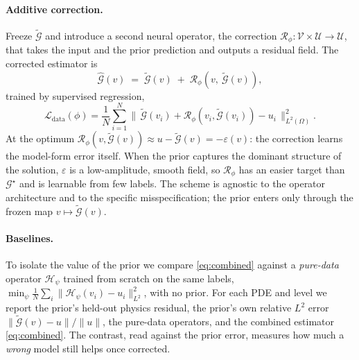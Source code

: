 \documentclass[11pt]{article}
\newcommand{\dom}{\Omega}
\newcommand{\Gtrue}{\mathcal{G}^{\star}}
\newcommand{\Gprior}{\widetilde{\mathcal{G}}}
\newcommand{\Ghat}{\widehat{\mathcal{G}}}
\newcommand{\Rcorr}{\mathcal{R}}
\newcommand{\norm}[1]{\lVert #1 \rVert}
\begin{document}
\paragraph{Additive correction.}
Freeze $\Gprior$ and introduce a second neural operator, the correction
$\Rcorr_\phi:\mathcal{V}\times\mathcal{U}\to\mathcal{U}$, that takes the input and the prior
prediction and outputs a residual field. The corrected estimator is
\begin{equation}
\label{eq:combined}
\Ghat(v) \;=\; \Gprior(v) \;+\; \Rcorr_\phi\!\left(v,\ \Gprior(v)\right),
\end{equation}
trained by supervised regression,
\begin{equation}
\label{eq:dataloss}
\mathcal{L}_{\mathrm{data}}(\phi)
= \frac{1}{N}\sum_{i=1}^{N}
\norm{\,\Gprior(v_i) + \Rcorr_\phi\!\left(v_i,\Gprior(v_i)\right) - u_i\,}_{L^2(\dom)}^{2}.
\end{equation}
At the optimum $\Rcorr_\phi(v,\Gprior(v))\approx u-\Gprior(v)=-\varepsilon(v)$: the correction
learns the model-form error itself. When the prior captures the dominant structure of the
solution, $\varepsilon$ is a low-amplitude, smooth field, so $\Rcorr_\phi$ has an easier target
than $\Gtrue$ and is learnable from few labels. The scheme is agnostic to the operator
architecture and to the specific misspecification; the prior enters only through the frozen map
$v\mapsto\Gprior(v)$.

\paragraph{Baselines.}
To isolate the value of the prior we compare \eqref{eq:combined} against a \emph{pure-data}
operator $\mathcal{H}_\psi$ trained from scratch on the same labels,
$\min_\psi \tfrac{1}{N}\sum_i \norm{\mathcal{H}_\psi(v_i)-u_i}_{L^2}^2$, with no prior. For each
PDE and level we report the prior's held-out physics residual, the prior's own relative $L^2$
error $\norm{\Gprior(v)-u}/\norm{u}$, the pure-data operators, and the combined estimator
\eqref{eq:combined}. The contrast, read against the prior error, measures how much a
\emph{wrong} model still helps once corrected.
\end{document}
